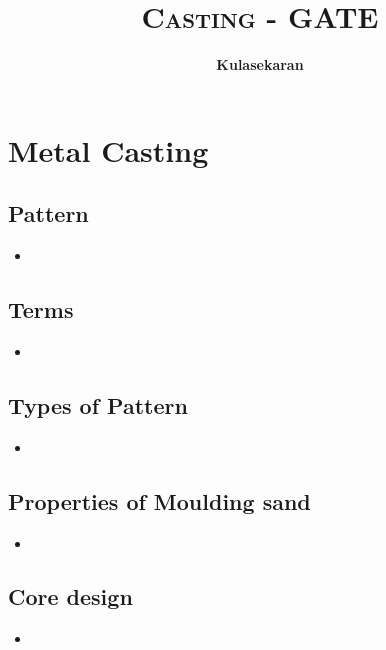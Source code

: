 \documentclass[8pt]{report}
\title{\Huge{\textsc{Casting - GATE}}}
\author{\huge{\textbf{Kulasekaran}}}
\begin{document}
\maketitle
\tableofcontents
\chapter{Metal Casting}
\section{Pattern}
	\begin{itemize}
		\item
	\end{itemize}\hrulefill
\section{Terms}
	\begin{itemize}
		\item
	\end{itemize}\hrulefill
\section{Types of Pattern}
	\begin{itemize}
		\item
	\end{itemize}\hrulefill
\section{Properties of Moulding sand}
	\begin{itemize}
		\item
	\end{itemize}\hrulefill
\section{Core design}
	\begin{itemize}
		\item
	\end{itemize}\hrulefill
\end{document}
